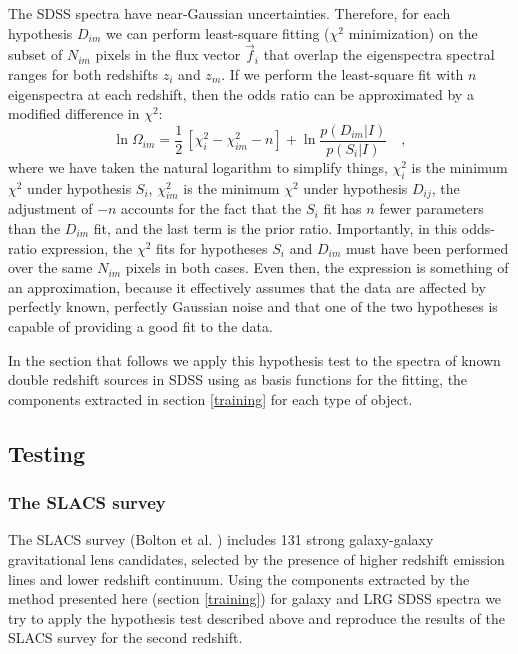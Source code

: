 \documentclass[apj]{emulateapj}
\begin{document}
The SDSS spectra have near-Gaussian uncertainties. Therefore, for each hypothesis $D_{im}$ we can perform least-square fitting ($\chi^2$ minimization) on the subset of $N_{im}$ pixels in the flux vector $\vec{f}_i$ that overlap the eigenspectra spectral ranges for both redshifts $z_i$ and $z_m$.  If we perform the least-square fit with $n$ eigenspectra at each redshift, then the odds ratio can be approximated by a modified difference in $\chi^2$:
\begin{equation}
\ln\Omega_{im}= \frac{1}{2}\,\left[\chi^2_i-\chi^2_{im}-n\right]
 +\ln\frac{p(D_{im}|I)}{p(S_i|I)} \quad,
\end{equation}
where we have taken the natural logarithm to simplify things, $\chi^2_i$ is the minimum $\chi^2$ under hypothesis $S_i$, $\chi^2_{im}$ is the minimum $\chi^2$ under hypothesis $D_{ij}$, the adjustment of $-n$ accounts for the fact that the $S_i$ fit has $n$ fewer parameters than the $D_{im}$ fit, and the last term is the prior ratio. Importantly, in this odds-ratio expression, the $\chi^2$ fits
for hypotheses $S_i$ and $D_{im}$ must have been performed over the same $N_{im}$ pixels in both cases. Even then, the expression is
something of an approximation, because it effectively assumes that the data are affected by perfectly known, perfectly Gaussian noise and
that one of the two hypotheses is capable of providing a good fit to the data.

In the section that follows we apply this hypothesis test to the spectra of known double redshift sources in SDSS using as basis functions for the fitting, the components extracted in section \ref{training} for each type of object.

\subsection{Testing}\label{testing}

\subsubsection{The SLACS survey}\label{slacs}
The SLACS survey (Bolton et al. \citealt{bolton}) includes 131 strong galaxy-galaxy gravitational lens candidates, selected by the presence of higher redshift emission lines and lower redshift continuum. Using the components extracted by the method presented here (section \ref{training}) for galaxy and LRG SDSS spectra we try to apply the hypothesis test described above and reproduce the results of the SLACS survey for the second redshift.
\end{document}
